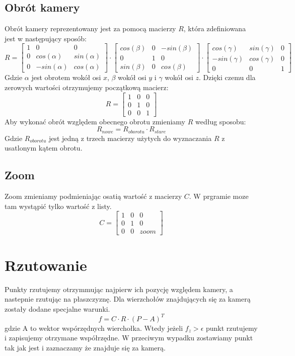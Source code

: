\documentclass[a4paper,11pt]{article}
\begin{document}
\subsection{Obrót kamery}
Obrót kamery reprezentowany jest za pomocą macierzy \(R\), która 
zdefiniowana jest w następujący sposób:
\[
    R = 
    \begin{bmatrix}
        1 & 0 & 0 \\
        0 & cos(\alpha) & sin(\alpha) \\
        0 & -sin(\alpha) & cos(\alpha) 
    \end{bmatrix}\cdot
    \begin{bmatrix}
        cos(\beta) & 0 & -sin(\beta) \\
        0 & 1 & 0 \\
        sin(\beta) & 0 & cos(\beta) 
    \end{bmatrix}\cdot
    \begin{bmatrix}
        cos(\gamma) & sin(\gamma) & 0 \\
        -sin(\gamma) & cos(\gamma) & 0 \\
        0 & 0 & 1 
    \end{bmatrix}
\]
Gdzie \(\alpha\) jest obrotem wokół osi \(x\), 
\(\beta\) wokół osi \(y\) i \(\gamma\) wokół osi \(z\). Dzięki 
czemu dla zerowych wartości otrzymujemy początkową macierz:
\[
    R = 
    \begin{bmatrix}
        1 & 0 & 0 \\
        0 & 1 & 0 \\
        0 & 0 & 1 
    \end{bmatrix}
\]
Aby wykonać obrót względem obecnego obrotu zmieniamy \(R\) według 
sposobu:
\[
    R_{nowe} = R_{oborotu} \cdot R_{stare}
\]
Gdzie \(R_{oborotu}\) jest jedną z trzech macierzy użytych do 
wyznaczania \(R\) z usatlonym kątem obrotu.
\subsection{Zoom}
Zoom zmieniamy podmieniając osatią wartość z macierzy \(C\).
W prgramie moze tam wystąpić tylko wartość z listy.
\[
    C = 
    \begin{bmatrix}
        1 & 0 & 0 \\
        0 & 1 & 0 \\
        0 & 0 & zoom 
    \end{bmatrix}
\]
\section{Rzutowanie}
Punkty rzutujemy otrzymmując najpierw ich pozycję względem 
kamery, a nastepnie rzutując na płaszczyznę. Dla wierzchołów 
znajdujących się za kamerą zostały dodane specjalne warunki.
\[
    f = C \cdot R \cdot (P - A)^T
\]
gdzie A to wektor wspórzędnych wierchołka. Wtedy jeżeli \(f_z > 
\epsilon\) punkt rzutujemy i zapisujemy otrzymane współrzędne.
W przeciwym wypadku zostawiamy punkt tak jak jest i zaznaczamy 
że znajduje się za kamerą.
\end{document}
